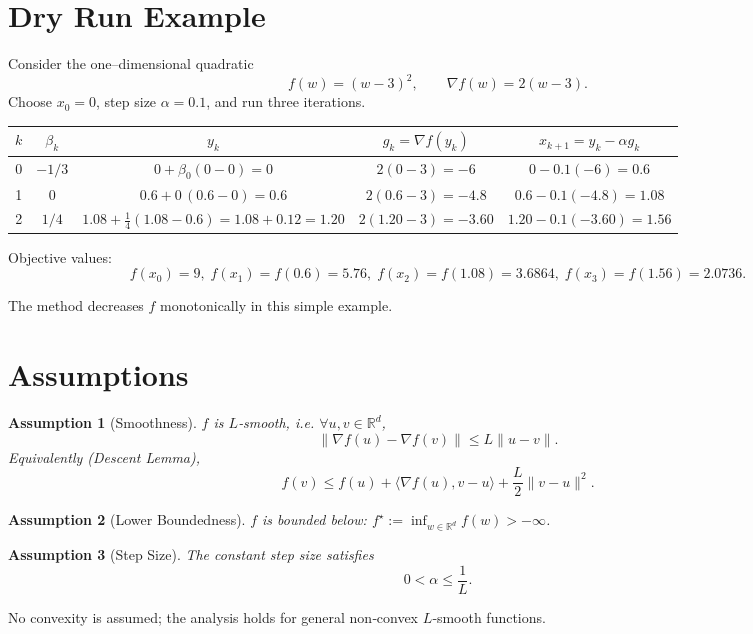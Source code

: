 \documentclass[11pt]{article}
\newtheorem{assumption}{Assumption}
\newcommand{\R}{\mathbb{R}}
\begin{document}
\section*{Dry Run Example}
Consider the one–dimensional quadratic
\[
f(w)=(w-3)^2,\qquad \nabla f(w)=2(w-3).
\]
Choose $x_0=0$, step size $\alpha=0.1$, and run three iterations.

\begin{center}
\begin{tabular}{c|c|c|c|c}
$k$ & $\beta_k$ & $y_k$ & $g_k=\nabla f(y_k)$ & $x_{k+1}=y_k-\alpha g_k$ \\ \hline
0 & $-1/3$ & $0+\beta_0(0-0)=0$ & $2(0-3)=-6$ & $0-0.1(-6)=0.6$ \\[0.4em]
1 & $0$   & $0.6+0\,(0.6-0)=0.6$ & $2(0.6-3)=-4.8$ & $0.6-0.1(-4.8)=1.08$ \\[0.4em]
2 & $1/4$ & $1.08+\tfrac14(1.08-0.6)=1.08+0.12=1.20$ &
$2(1.20-3)=-3.60$ & $1.20-0.1(-3.60)=1.56$ 
\end{tabular}
\end{center}

Objective values:
\[
f(x_0)=9,\; f(x_1)=f(0.6)=5.76,\; f(x_2)=f(1.08)=3.6864,\; f(x_3)=f(1.56)=2.0736.
\]

The method decreases $f$ monotonically in this simple example.

\section*{Assumptions}
\begin{assumption}[Smoothness]\label{as:smooth}
$f$ is $L$‑smooth, i.e. $\forall u,v\in\R^d$,
\[
\|\nabla f(u)-\nabla f(v)\|\le L\|u-v\|.
\tag{2}
\]
Equivalently (Descent Lemma),
\[
f(v)\le f(u)+\langle\nabla f(u),v-u\rangle+\frac{L}{2}\|v-u\|^2 .
\tag{3}
\]
\end{assumption}

\begin{assumption}[Lower Boundedness]\label{as:lb}
$f$ is bounded below: $f^\star:=\inf_{w\in\R^d}f(w)>-\infty$.
\end{assumption}

\begin{assumption}[Step Size]\label{as:step}
The constant step size satisfies
\[
0<\alpha\le\frac{1}{L}.
\tag{4}
\]
\end{assumption}

No convexity is assumed; the analysis holds for general non‑convex $L$‑smooth functions.
\end{document}
